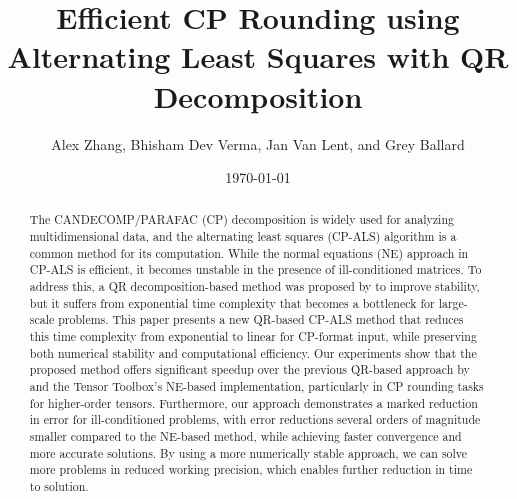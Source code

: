 \documentclass{article}
\title{Efficient CP Rounding using Alternating Least Squares with QR Decomposition}
\author{Alex Zhang, Bhisham Dev Verma, Jan Van Lent, and Grey Ballard}
\date{\today}
\begin{document}
\maketitle
\begin{abstract}
The CANDECOMP/PARAFAC (CP) decomposition is widely used for analyzing multidimensional data, and the alternating least squares (CP-ALS) algorithm is a common method for its computation.  While the normal equations (NE) approach in CP-ALS is efficient, it becomes unstable in the presence of ill-conditioned matrices. To address this, a QR decomposition-based method was proposed by \cite{MVLB23} to improve stability, but it suffers from exponential time complexity that becomes a bottleneck for large-scale problems. This paper presents a new QR-based CP-ALS method that reduces this time complexity from exponential to linear for CP-format input, while preserving both numerical stability and computational efficiency. Our experiments show that the proposed method offers significant speedup over the previous QR-based approach by \cite{MVLB23} and the Tensor Toolbox's NE-based implementation, particularly in CP rounding tasks for higher-order tensors. Furthermore, our approach demonstrates a marked reduction in error for ill-conditioned problems, with error reductions several orders of magnitude smaller compared to the NE-based method, while achieving faster convergence and more accurate solutions.  By using a more numerically stable approach, we can solve more problems in reduced working precision, which enables further reduction in time to solution.
\end{abstract}
\end{document}
